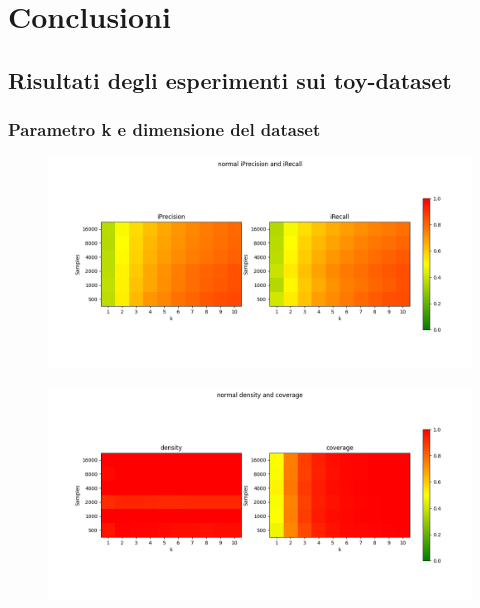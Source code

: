 \chapter{Conclusioni}\label{ch:conclusioni}

\section{Risultati degli esperimenti sui toy-dataset}

\subsection{Parametro k e dimensione del dataset}

\begingroup

    \begin{figure}
        \centering
        \includegraphics[width=\linewidth]{../images/toyexperiments/kdim/normal_iPrecision_iRecall.png}
    \end{figure}

    \begin{figure}
        \centering
        \includegraphics[width=\linewidth]{../images/toyexperiments/kdim/normal_density_coverage.png}
    \end{figure}    

